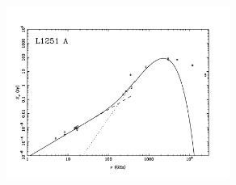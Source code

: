 \documentclass[9pt]{extarticle}   	%
\begin{document}
\begin{figure}[htbp]
\begin{center}
\includegraphics[width=0.65\textwidth]{plots/L1251.pdf}
\label{default}
\end{center}
\end{figure}

\clearpage
\end{document}
